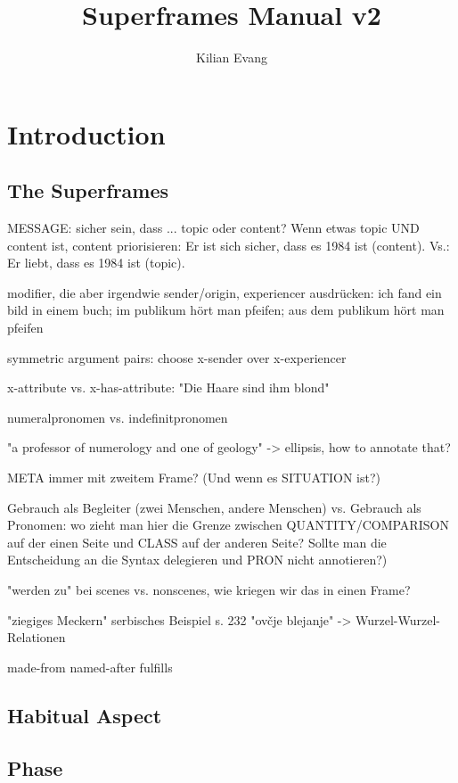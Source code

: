 \documentclass[a4paper]{article}
\title{Superframes Manual v2}
\author{Kilian Evang}
\begin{document}
\maketitle

\section{Introduction}

\subsection{The Superframes}

MESSAGE: sicher sein, dass ... topic oder content?
Wenn etwas topic UND content ist, content priorisieren: Er ist sich sicher, dass es 1984 ist (content). Vs.: Er liebt, dass es 1984 ist (topic).

modifier, die aber irgendwie sender/origin, experiencer ausdrücken: ich fand ein bild in einem buch; im publikum hört man pfeifen; aus dem publikum hört man pfeifen

symmetric argument pairs: choose x-sender over x-experiencer

x-attribute vs. x-has-attribute: "Die Haare sind ihm blond"

numeralpronomen vs. indefinitpronomen

"a professor of numerology and one of geology" -> ellipsis, how to annotate that?

META immer mit zweitem Frame? (Und wenn es SITUATION ist?)

Gebrauch als Begleiter (zwei Menschen, andere Menschen) vs. Gebrauch als Pronomen: wo zieht man hier die Grenze zwischen QUANTITY/COMPARISON auf der einen Seite und CLASS auf der anderen Seite? Sollte man die Entscheidung an die Syntax delegieren und PRON nicht annotieren?)

"werden zu" bei scenes vs. nonscenes, wie kriegen wir das in einen Frame?

"ziegiges Meckern" serbisches Beispiel s. 232 "ovčje blejanje" -> Wurzel-Wurzel-Relationen

made-from
named-after
fulfills

\subsection{Habitual Aspect}

\subsection{Phase}
\end{document}
